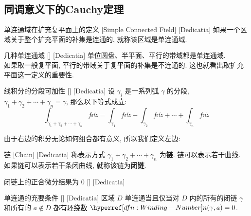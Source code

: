     \subsection{同调意义下的Cauchy定理}

        \begin{dfn}
            {单连通域在扩充复平面上的定义}
            [Simple Connected Field]
            [Dedicatia]
            如果一个区域关于整个扩充平面的补集是连通的, 就称该区域是单连通域. 
        \end{dfn}

        \begin{xmp}
            {几种单连通域}
            []
            [Dedicatia]
            单位圆盘、半平面、平行的带域都是单连通域. \\
            如果取一般复平面, 平行的带域关于复平面的补集是不连通的. 这也就看出取扩充平面这一定义的重要性. 
        \end{xmp}

        \begin{ppt}
            {线积分的分段可加性}
            []
            [Dedicatia]
            设 \(\gamma_i\) 是一系列弧 \(\gamma\) 的分段,  \(\gamma_1+\gamma_2+\cdots+\gamma_n=\gamma\), 那么以下等式成立: 
            \[\int_{\gamma_1+\gamma_2+\cdots+\gamma_n}f\dd{z}=\int_{\gamma_1}f\dd{z}+\int_{\gamma_2}f\dd{z}+\cdots+\int_{\gamma_n}f\dd{z}\]
        \end{ppt}

        由于右边的积分无论如何组合都有意义, 所以我们定义左边: 

        \begin{dfn}
            [Chain]
            {链}
            [Chain]
            [Dedicatia]
            称表示方式 \(\gamma_1+\gamma_2+\cdots+\gamma_n\) 为\textbf{链}. 链可以表示若干曲线. 如果链可以表示若干条闭曲线, 就称该链为\textbf{闭链}. 
        \end{dfn}

        \begin{ppt}
            {闭链上的正合微分结果为 0}
            []
            [Dedicatia]
        \end{ppt}

        \begin{thm}
            {单连通的充要条件}
            []
            [Dedicatia]
            区域 \(D\) 单连通当且仅当对 \(D\) 内的所有的闭链 \(\gamma\) 和所有的 \(a\notin D\) 都有\hyperref[dfn:Winding-Number]{环绕数} \(\Windn(\gamma,a)=0\).
        \end{thm}

